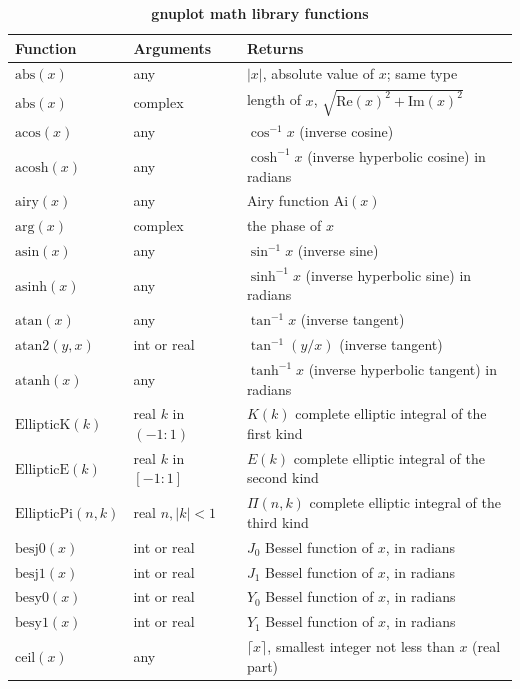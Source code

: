 \documentclass[
  hyper, lang=cn, 
  class=l3dox, 
]{../../zlatex/code/ztex}
\begin{document}
\begin{center}
  \begin{longtable}{lll}
    \caption{\textbf{gnuplot math library functions}}\\
    \toprule
    \textbf{Function} & \textbf{Arguments} & \textbf{Returns} \\
    \midrule
    \(\text{abs}(x)\) & any & $|x|$, absolute value of $x$; same type \\
    \(\text{abs}(x)\) & complex & length of $x$, $\sqrt{\text{Re}(x)^2 + \text{Im}(x)^2}$ \\
    \(\text{acos}(x)\) & any & $\cos^{-1} x$ (inverse cosine) \\
    \(\text{acosh}(x)\) & any & $\cosh^{-1} x$ (inverse hyperbolic cosine) in radians \\
    \(\text{airy}(x)\) & any & Airy function $\text{Ai}(x)$ \\
    \(\text{arg}(x)\) & complex & the phase of $x$ \\
    \(\text{asin}(x)\) & any & $\sin^{-1} x$ (inverse sine) \\
    \(\text{asinh}(x)\) & any & $\sinh^{-1} x$ (inverse hyperbolic sine) in radians \\
    \(\text{atan}(x)\) & any & $\tan^{-1} x$ (inverse tangent) \\
    \(\text{atan2}(y,x)\) & int or real & $\tan^{-1}(y/x)$ (inverse tangent) \\
    \(\text{atanh}(x)\) & any & $\tanh^{-1} x$ (inverse hyperbolic tangent) in radians \\
    \(\text{EllipticK}(k)\) & real  $k$ in $(-1:1)$ & $K(k)$ complete elliptic integral of the first kind \\
    \(\text{EllipticE}(k)\) & real  $k$ in $[-1:1]$ & $E(k)$ complete elliptic integral of the second kind \\
    \(\text{EllipticPi}(n,k)\) & real $n,|k|<1$ & $\Pi(n,k)$ complete elliptic integral of the third kind \\
    \(\text{besj0}(x)\) & int or real & $J_0$ Bessel function of $x$, in radians \\
    \(\text{besj1}(x)\) & int or real & $J_1$ Bessel function of $x$, in radians \\
    \(\text{besy0}(x)\) & int or real & $Y_0$ Bessel function of $x$, in radians \\
    \(\text{besy1}(x)\) & int or real & $Y_1$ Bessel function of $x$, in radians \\
    \(\text{ceil}(x)\) & any & $\lceil x \rceil$, smallest integer not less than $x$ (real part) \\

\end{longtable}
\end{center}
\end{document}
